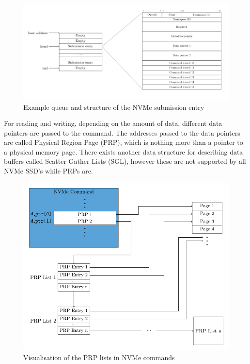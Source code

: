 \begin{figure}
  \centering
    \includegraphics[width=\textwidth]{figures/nvme-queue}
    \caption{Example queue and structure of the NVMe submission entry}
    \label{fig:nvme-queue}
\end{figure}


For reading and writing, depending on the amount of data, different data pointers are passed to the command. The addresses passed to the data pointers are called Physical Region Page (PRP), which is nothing more than a pointer to a physical memory page. There exists another data structure for describing data buffers called Scatter Gather Lists (SGL), however these are not supported by all NVMe SSD's while PRPs are.

\begin{figure}
  \centering
    \includegraphics[width=\textwidth]{figures/prp-list}
    \caption{Visualisation of the PRP lists in NVMe commands}
    \label{fig:prp-list}
\end{figure}

